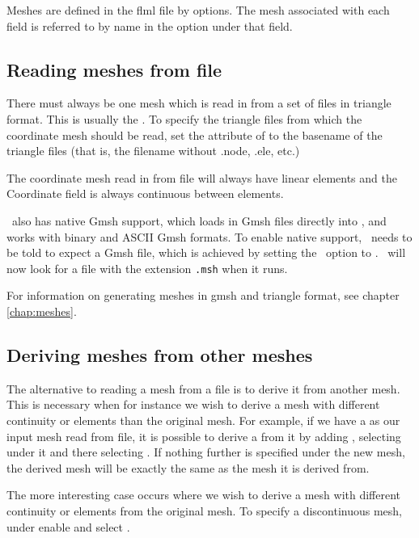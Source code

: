 Meshes are defined in the flml file by  options. The
mesh associated with each field is referred to by name in the
 option under that field.

\subsection{Reading meshes from file}
There must always be one mesh which is read in from a set of files in
triangle format. This is usually the . To specify the
triangle files from which the coordinate mesh should be read, set the
 attribute of
 to the basename
of the triangle files (that is, the filename without .node, .ele, etc.)

The coordinate mesh read in from file will always have linear elements and
the Coordinate field is always continuous between elements.

\fluidity\ also has native Gmsh support, which loads in Gmsh files directly into
\fluidity, and works with binary and ASCII Gmsh formats. To enable native 
support, \fluidity\ needs to be told to expect a Gmsh file, which is achieved 
by setting the \onlypdf{}\ option 
to \onlypdf{}.  \fluidity\ will now look for a file with the extension 
\lstinline[language=bash]+.msh+ when it runs.

For information on generating meshes in gmsh and triangle format, see chapter
\ref{chap:meshes}. 

\subsection{Deriving meshes from other meshes}
The alternative to reading a mesh from a file is to derive it from another
mesh. This is necessary when for instance we wish to derive a mesh with
different continuity or elements than the original mesh. 
For example, if we have a  as our input mesh read 
from file, it is possible to derive a  from it
by adding , selecting 
 under it and there selecting
. If nothing further is specified 
under the new mesh, the derived mesh will be exactly the same as the mesh
it is derived from.

The more interesting case occurs where we wish to derive a mesh with
different continuity or elements from the original mesh. To specify a
discontinuous mesh, under  enable
 and select .

